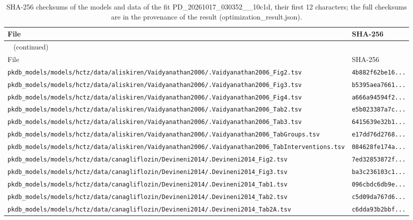 \begin{longtable}{ll}
\caption{SHA-256 checksums of the models and data of the fit PD\_20261017\_030352\_\_10c1d, their first 12 characters; the full checksums are in the provenance of the result (optimization\_result.json).}\label{tab:checksums:PD_20261017_030352__10c1d} \\
\toprule
File & SHA-256 \\
\midrule
\endfirsthead
\multicolumn{2}{l}{\small\tablename~\thetable{} (continued)} \\
\toprule
File & SHA-256 \\
\midrule
\endhead
\bottomrule
\endlastfoot
\texttt{pkdb\_models/models/hctz/data/aliskiren/Vaidyanathan2006/.Vaidyanathan2006\_Fig2.tsv} & \texttt{4b882f62be16...} \\
\texttt{pkdb\_models/models/hctz/data/aliskiren/Vaidyanathan2006/.Vaidyanathan2006\_Fig3.tsv} & \texttt{b5395aea7661...} \\
\texttt{pkdb\_models/models/hctz/data/aliskiren/Vaidyanathan2006/.Vaidyanathan2006\_Fig4.tsv} & \texttt{a666a94594f2...} \\
\texttt{pkdb\_models/models/hctz/data/aliskiren/Vaidyanathan2006/.Vaidyanathan2006\_Tab2.tsv} & \texttt{e5b023387a7c...} \\
\texttt{pkdb\_models/models/hctz/data/aliskiren/Vaidyanathan2006/.Vaidyanathan2006\_Tab3.tsv} & \texttt{6415639e32b1...} \\
\texttt{pkdb\_models/models/hctz/data/aliskiren/Vaidyanathan2006/.Vaidyanathan2006\_TabGroups.tsv} & \texttt{e17dd76d2768...} \\
\texttt{pkdb\_models/models/hctz/data/aliskiren/Vaidyanathan2006/.Vaidyanathan2006\_TabInterventions.tsv} & \texttt{084628fe174a...} \\
\texttt{pkdb\_models/models/hctz/data/canagliflozin/Devineni2014/.Devineni2014\_Fig2.tsv} & \texttt{7ed32853872f...} \\
\texttt{pkdb\_models/models/hctz/data/canagliflozin/Devineni2014/.Devineni2014\_Fig3.tsv} & \texttt{ba3c236103c1...} \\
\texttt{pkdb\_models/models/hctz/data/canagliflozin/Devineni2014/.Devineni2014\_Tab1.tsv} & \texttt{096cbdc6db9e...} \\
\texttt{pkdb\_models/models/hctz/data/canagliflozin/Devineni2014/.Devineni2014\_Tab2.tsv} & \texttt{c5d09da767d6...} \\
\texttt{pkdb\_models/models/hctz/data/canagliflozin/Devineni2014/.Devineni2014\_Tab2A.tsv} & \texttt{c6dda93b2bbf...} \\

\end{longtable}
